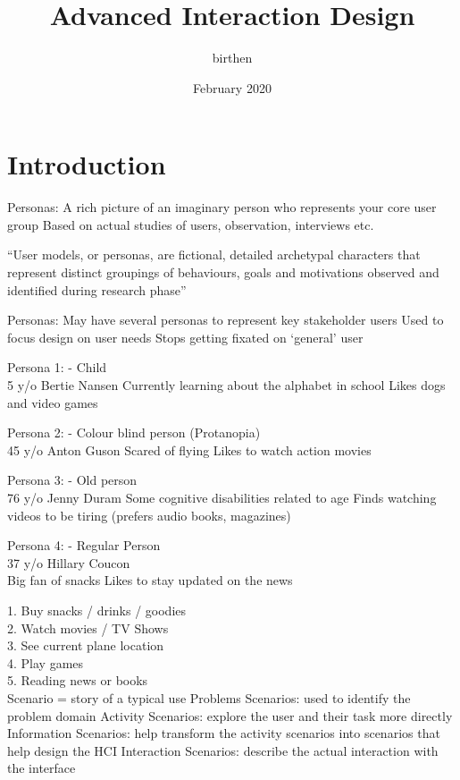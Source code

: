 \documentclass[a4paper, 11pt]{article}
\begin{document}
\title{Advanced Interaction Design}
\author{birthen }
\date{February 2020}



\maketitle

\section{Introduction}

Personas:
A rich picture of an imaginary person who represents your core user group
Based on actual studies of users, observation, interviews etc. 

“User models, or personas, are fictional, detailed archetypal characters that represent distinct groupings of behaviours, goals and motivations observed and identified during research phase”

Personas:
May have several personas to represent key stakeholder users
Used to focus design on user needs 
Stops getting fixated on ‘general’ user




Persona 1: - Child\\
5 y/o 
Bertie Nansen 
Currently learning about the alphabet in school
Likes dogs and video games


Persona 2: - Colour blind person (Protanopia)\\
45 y/o
Anton Guson
Scared of flying
Likes to watch action movies

Persona 3: - Old person\\
76 y/o
Jenny Duram
Some cognitive disabilities related to age
Finds watching videos to be tiring (prefers audio books, magazines)

Persona 4: - Regular Person\\
37 y/o
Hillary Coucon\\
Big fan of snacks
Likes to stay updated on the news 

1. Buy snacks / drinks / goodies\\
2. Watch movies / TV Shows\\
3. See current plane location\\
4. Play games\\
5. Reading news or books\\


Scenario = story of a typical use
Problems Scenarios: used to identify the problem domain
Activity Scenarios: explore the user and their task more directly
Information Scenarios: help transform the activity scenarios into scenarios that help design the HCI
Interaction Scenarios: describe the actual interaction with the interface
\end{document}
